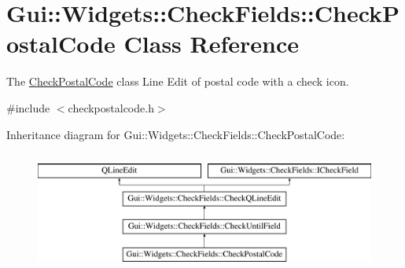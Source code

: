 \hypertarget{classGui_1_1Widgets_1_1CheckFields_1_1CheckPostalCode}{}\section{Gui\+:\+:Widgets\+:\+:Check\+Fields\+:\+:Check\+Postal\+Code Class Reference}
\label{classGui_1_1Widgets_1_1CheckFields_1_1CheckPostalCode}


The \hyperlink{classGui_1_1Widgets_1_1CheckFields_1_1CheckPostalCode}{Check\+Postal\+Code} class Line Edit of postal code with a check icon.  




{\ttfamily \#include $<$checkpostalcode.\+h$>$}

Inheritance diagram for Gui\+:\+:Widgets\+:\+:Check\+Fields\+:\+:Check\+Postal\+Code\+:\begin{figure}[H]
\begin{center}
\leavevmode
\includegraphics[height=4.000000cm]{df/d31/classGui_1_1Widgets_1_1CheckFields_1_1CheckPostalCode}
\end{center}
\end{figure}
